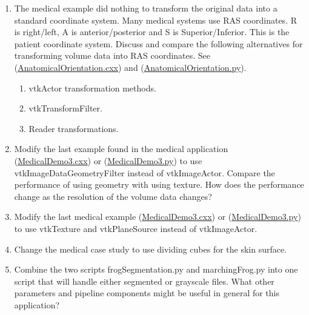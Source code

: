 \begin{enumerate}

    \item The medical example did nothing to transform the original data into a standard coordinate system. Many medical systems use RAS coordinates. R is right/left, A is anterior/posterior and S is Superior/Inferior. This is the patient coordinate system. Discuss and compare the following alternatives for transforming volume data into RAS coordinates. See (\href{https://lorensen.github.io/VTKExamples/site/Cxx/VisualizationAlgorithms/AnatomicalOrientation/}{AnatomicalOrientation.cxx}) and (\href{https://lorensen.github.io/VTKExamples/site/Python/VisualizationAlgorithms/AnatomicalOrientation/}{AnatomicalOrientation.py}).
    \begin{enumerate}
        \item vtkActor transformation methods.
        \item vtkTransformFilter.
        \item Reader transformations.
    \end{enumerate}

    \item Modify the last example found in the medical application (\href{https://lorensen.github.io/VTKExamples/site/Cxx/Medical/MedicalDemo3/}{MedicalDemo3.cxx}) or (\href{https://lorensen.github.io/VTKExamples/site/Python/Medical/MedicalDemo3/}{MedicalDemo3.py}) to use vtkImageDataGeometryFilter instead of
    vtkImageActor. Compare the performance of using geometry with using
    texture. How does the performance change as the resolution of the
    volume data changes?

    \item Modify the last medical example (\href{https://lorensen.github.io/VTKExamples/site/Cxx/Medical/MedicalDemo3/}{MedicalDemo3.cxx}) or (\href{https://lorensen.github.io/VTKExamples/site/Python/Medical/MedicalDemo3/}{MedicalDemo3.py}) to use vtkTexture and vtkPlaneSource instead of vtkImageActor.

    \item Change the medical case study to use dividing cubes for the skin surface.

    \item Combine the two scripts frogSegmentation.py and marchingFrog.py into one script that will handle either segmented or grayscale files. What other parameters and pipeline components might be useful in general for this application?


\end{enumerate}
